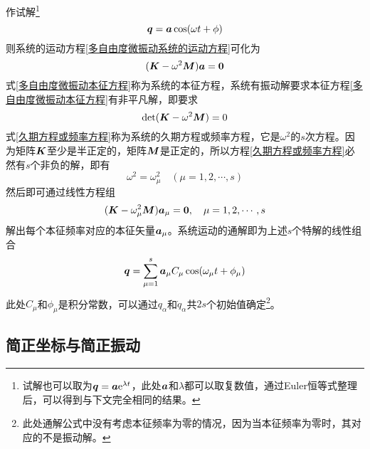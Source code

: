 作试解\footnote{试解也可以取为$\boldsymbol{q}=\boldsymbol{a}\mathrm{e}^{\lambda t}$，此处$\boldsymbol{a}$和$\lambda$都可以取复数值，通过Euler恒等式整理后，可以得到与下文完全相同的结果。}
\begin{equation}
	\boldsymbol{q} = \boldsymbol{a} \cos (\omega t+\phi)
\end{equation}
则系统的运动方程\eqref{多自由度微振动系统的运动方程}可化为
\begin{equation}
	(\boldsymbol{K} - \omega^2 \boldsymbol{M})\boldsymbol{a} = \boldsymbol{0}
	\label{多自由度微振动本征方程}
\end{equation}
式\eqref{多自由度微振动本征方程}称为系统的{\heiti 本征方程}，系统有振动解要求本征方程\eqref{多自由度微振动本征方程}有非平凡解，即要求
\begin{equation}
	\det (\boldsymbol{K} - \omega^2 \boldsymbol{M}) = 0
	\label{久期方程或频率方程}
\end{equation}
式\eqref{久期方程或频率方程}称为系统的{\heiti 久期方程}或{\heiti 频率方程}，它是$\omega^2$的$s$次方程。因为矩阵$\boldsymbol{K}$至少是半正定的，矩阵$\boldsymbol{M}$是正定的，所以方程\eqref{久期方程或频率方程}必然有$s$个非负的解，即有
\begin{equation*}
	\omega^2 = \omega_\mu^2 \quad (\mu = 1,2,\cdots,s)
\end{equation*}
然后即可通过线性方程组
\begin{equation*}
	(\boldsymbol{K} - \omega_\mu^2 \boldsymbol{M}) \boldsymbol{a}_\mu = \boldsymbol{0},\quad \mu = 1,2,\cdots,s
\end{equation*}
解出每个本征频率对应的本征矢量$\boldsymbol{a}_\mu$。系统运动的通解即为上述$s$个特解的线性组合
\begin{equation}
	\boldsymbol{q} = \sum_{\mu=1}^s \boldsymbol{a}_\mu C_\mu \cos (\omega_\mu t + \phi_\mu)
	\label{多自由度微振动通解}
\end{equation}
此处$C_\mu$和$\phi_\mu$是积分常数，可以通过$q_\alpha$和$\dot{q}_\alpha$共$2s$个初始值确定\footnote{此处通解公式中没有考虑本征频率为零的情况，因为当本征频率为零时，其对应的不是振动解。}。

\subsection{简正坐标与简正振动}

